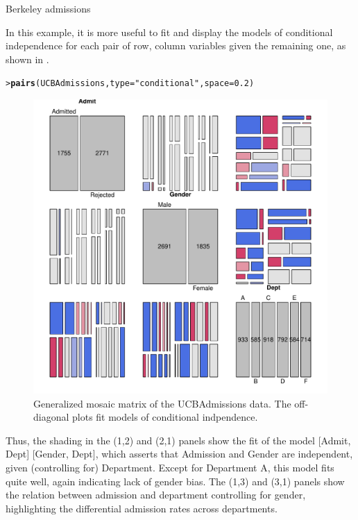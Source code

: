 \documentclass[10pt,krantz2]{krantz}\usepackage[]{graphicx}\usepackage[]{color}
\makeatletter
\newcommand{\hlnum}[1]{\textcolor[rgb]{0.686,0.059,0.569}{#1}}%
\newcommand{\hlstr}[1]{\textcolor[rgb]{0.192,0.494,0.8}{#1}}%
\newcommand{\hlstd}[1]{\textcolor[rgb]{0.345,0.345,0.345}{#1}}%
\newcommand{\hlkwc}[1]{\textcolor[rgb]{0.333,0.667,0.333}{#1}}%
\newcommand{\hlkwd}[1]{\textcolor[rgb]{0.737,0.353,0.396}{\textbf{#1}}}%
\newenvironment{kframe}{%
 \def\at@end@of@kframe{}%
 \ifinner\ifhmode%
  \def\at@end@of@kframe{\end{minipage}}%
  \begin{minipage}{\columnwidth}%
 \fi\fi%
 \def\FrameCommand##1{\hskip\@totalleftmargin \hskip-\fboxsep
 \colorbox{shadecolor}{##1}\hskip-\fboxsep
     \hskip-\linewidth \hskip-\@totalleftmargin \hskip\columnwidth}%
 \MakeFramed {\advance\hsize-\width
   \@totalleftmargin\z@ \linewidth\hsize
   \@setminipage}}%
 {\par\unskip\endMakeFramed%
 \at@end@of@kframe}
\newenvironment{knitrout}{}{} %
\renewenvironment{knitrout}{\small\renewcommand{\baselinestretch}{.85}}{} %
\makeatother
\begin{document}
\begin{Example}[berkeley4b]{Berkeley admissions}
\begin{knitrout}
\end{knitrout}

In this example, it is more useful to fit and display the models of conditional independence
for each pair of row, column variables given the remaining one, as shown in .
\begin{knitrout}
\color{fgcolor}\begin{kframe}
\begin{alltt}
\hlstd{> }\hlkwd{pairs}\hlstd{(UCBAdmissions,} \hlkwc{type} \hlstd{=} \hlstr{"conditional"}\hlstd{,} \hlkwc{space} \hlstd{=} \hlnum{0.2}\hlstd{)}
\end{alltt}
\end{kframe}\begin{figure}[!htb]

\centerline{\includegraphics[width=.8\textwidth]{ch05/fig/berk-pairs3-1} }

\caption[Generalized mosaic matrix of the UCBAdmissions data]{Generalized mosaic matrix of the UCBAdmissions data. The off-diagonal plots fit models of conditional indpendence.}\label{fig:berk-pairs3}
\end{figure}


\end{knitrout}
Thus, the shading in the (1,2) and (2,1) panels show the fit of the model
[Admit, Dept] [Gender, Dept],
which asserts that Admission and Gender are independent, given (controlling
for) Department.  Except for Department A, this model fits quite well,
again indicating lack of gender bias.
The (1,3) and (3,1) panels show the relation between admission and department
controlling for gender, highlighting the differential admission rates
across departments.

\end{Example}
\end{document}
